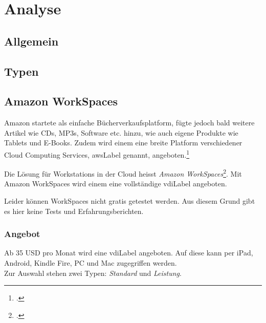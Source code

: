 

\chapter{Analyse}

\section{Allgemein}

\section{Typen}

\section{Amazon WorkSpaces}

Amazon startete als einfache Bücherverkaufsplatform, fügte jedoch bald weitere Artikel wie CDs, MP3s, Software etc. hinzu, wie auch eigene Produkte wie Tablets und E-Books.
Zudem wird einem eine breite Platform verschiedener Cloud Computing Services, \Gls{awsLabel} genannt, angeboten.\footcite{Amazon.com_-_Wikipedia_the_free_encyclopedia_2014-11-15}

Die Lösung für Workstations in der Cloud heisst \textit{Amazon WorkSpaces}\footcite{AWS_Amazon_WorkSpaces_2014-11-03}.
Mit Amazon WorkSpaces wird einem eine vollständige \Gls{vdiLabel} angeboten.

Leider können WorkSpaces nicht gratis getestet werden. Aus diesem Grund gibt es hier keine Tests und Erfahrungsberichten.

\subsection{Angebot}
Ab 35 USD pro Monat wird eine \Gls{vdiLabel} angeboten. Auf diese kann per iPad, Android, Kindle Fire, PC und Mac zugegriffen werden.\\
Zur Auswahl stehen zwei Typen: \textit{Standard} und \textit{Leistung}.


